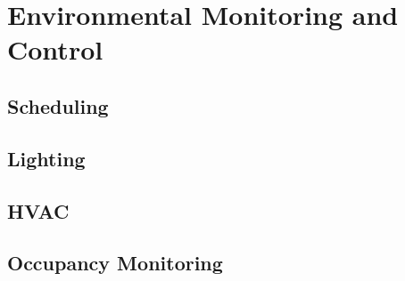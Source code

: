 \chapter{Environmental Monitoring and Control}

\section{Scheduling}

\section{Lighting}

\section{HVAC}

\section{Occupancy Monitoring}

